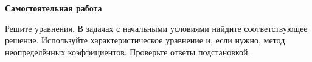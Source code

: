 \vfil\eject
\centerline{\bf Самостоятельная работа}
\bigskip
Решите уравнения. В задачах с начальными условиями найдите соответствующее
решение. Используйте характеристическое уравнение и, если нужно, метод
неопределённых коэффициентов. Проверьте ответы подстановкой.
\bye
